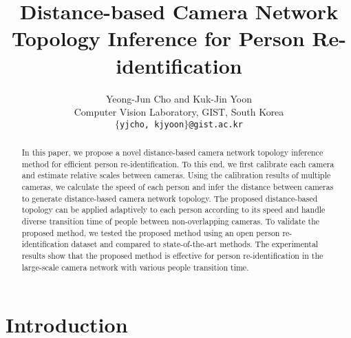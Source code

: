 \documentclass[10pt,twocolumn,letterpaper]{article}
\begin{document}
	
	\title{Distance-based Camera Network Topology Inference for Person Re-identification}
	
	\author{\qquad Yeong-Jun Cho and Kuk-Jin Yoon\\
		\qquad Computer Vision Laboratory, GIST, South Korea\\
		{\tt\small\qquad $\lbrace${yjcho, kjyoon}$\rbrace$@gist.ac.kr}
		\and
	}
	
	\maketitle
	
	\begin{abstract}
		
		In this paper, we propose a novel distance-based camera network topology inference method for efficient person re-identification. To this end, we first calibrate each camera and estimate relative scales between cameras. Using the calibration results of multiple cameras, we calculate the speed of each person and infer the distance between cameras to generate distance-based camera network topology. The proposed distance-based topology can be applied adaptively to each person according to its speed and handle diverse transition time of people between non-overlapping cameras. To validate the proposed method, we tested the proposed method using an open person re-identification dataset and compared to state-of-the-art methods.
		The experimental results show that the proposed method is effective for person re-identification in the large-scale camera network with various people transition time.
		
	\end{abstract}
	
	
	\vspace{-10pt}
	\section{Introduction}
	
\end{document}
